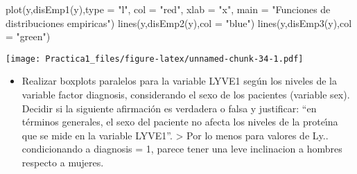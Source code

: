\documentclass[
]{article}
\newenvironment{Shaded}{\begin{snugshade}}{\end{snugshade}}
\newcommand{\AttributeTok}[1]{\textcolor[rgb]{0.77,0.63,0.00}{#1}}
\newcommand{\FunctionTok}[1]{\textcolor[rgb]{0.00,0.00,0.00}{#1}}
\newcommand{\NormalTok}[1]{#1}
\newcommand{\StringTok}[1]{\textcolor[rgb]{0.31,0.60,0.02}{#1}}
\providecommand{\tightlist}{%
  \setlength{\itemsep}{0pt}\setlength{\parskip}{0pt}}
\begin{document}
\begin{Shaded}
\begin{Highlighting}[]
\FunctionTok{plot}\NormalTok{(y,}\FunctionTok{disEmp1}\NormalTok{(y),}\AttributeTok{type =} \StringTok{"l"}\NormalTok{, }\AttributeTok{col =} \StringTok{"red"}\NormalTok{, }\AttributeTok{xlab =} \StringTok{"x"}\NormalTok{, }\AttributeTok{main =} \StringTok{"Funciones de distribuciones empiricas"}\NormalTok{)}
\FunctionTok{lines}\NormalTok{(y,}\FunctionTok{disEmp2}\NormalTok{(y),}\AttributeTok{col =} \StringTok{"blue"}\NormalTok{)}
\FunctionTok{lines}\NormalTok{(y,}\FunctionTok{disEmp3}\NormalTok{(y),}\AttributeTok{col =} \StringTok{"green"}\NormalTok{)}
\end{Highlighting}
\end{Shaded}

\texttt{[image: Practica1\_files/figure-latex/unnamed-chunk-34-1.pdf]}

\begin{itemize}
\tightlist
\item
  Realizar boxplots paralelos para la variable LYVE1 según los niveles
  de la variable factor diagnosis, considerando el sexo de los pacientes
  (variable sex). Decidir si la siguiente afirmación es verdadera o
  falsa y justificar: ``en términos generales, el sexo del paciente no
  afecta los niveles de la proteı́na que se mide en la variable LYVE1''.
  \textgreater{} Por lo menos para valores de Ly.. condicionando a
  diagnosis = 1, parece tener una leve inclinacion a hombres respecto a
  mujeres.
\end{itemize}
\end{document}
